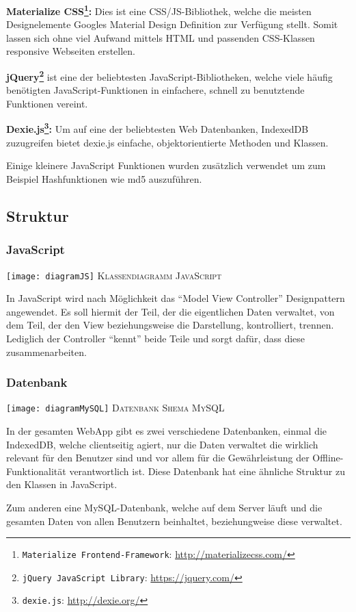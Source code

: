 \documentclass[a4paper,12pt,ngerman,listof=numbered]{scrartcl}      %
\let\oldcite\cite
\renewcommand{\cite}[1]{\textsuperscript{\oldcite{#1}}}
\newcommand{\spacer}{\par\bigskip\noindent}
\providecommand{\inlinecode}[1]{\texttt{#1}}
\begin{document}
	\spacer\textbf{Materialize CSS\footnote{\inlinecode{Materialize Frontend-Framework}: \url{http://materializecss.com/}}:} Dies ist eine CSS/JS-Bibliothek, welche die meisten Designelemente Googles Material Design Definition zur Verfügung stellt. Somit lassen sich ohne viel Aufwand mittels HTML und passenden CSS-Klassen responsive Webseiten erstellen.\par
	\spacer\textbf{jQuery\footnote{\inlinecode{jQuery JavaScript Library}: \url{https://jquery.com/}}} ist eine der beliebtesten JavaScript-Bibliotheken\cite{jQueryCoverage}, welche viele häufig be\-nö\-ti\-gten JavaScript-Funktionen in einfachere, schnell zu benutztende Funktionen vereint.\par
	\spacer\textbf{Dexie.js\footnote{\inlinecode{dexie.js}: \url{http://dexie.org/}}:} Um auf eine der beliebtesten Web Datenbanken, IndexedDB zuzugreifen bietet dexie.js einfache, objektorientierte Methoden und Klassen.\par
	\spacer Einige kleinere JavaScript Funktionen wurden zusätzlich verwendet um zum Beispiel Hashfunktionen wie md5 auszuführen.\par
	
	\newpage
	\subsection{Struktur}
	\subsubsection{JavaScript}
	{
		\centering
		\texttt{[image: diagramJS]}
		\textsc{Klassendiagramm JavaScript}\par
	}
	In JavaScript wird nach Möglichkeit das ``Model View Controller''\cite{wikiMVC} Design\-pat\-tern angewendet. Es soll hiermit der Teil, der die eigentlichen Daten verwaltet, von dem Teil, der den View beziehungsweise die Darstellung, kontrolliert, trennen. Lediglich der Controller ``kennt'' beide Teile und sorgt dafür, dass diese zusammenarbeiten.\par
	
	\subsubsection{Datenbank}
	{
		\centering
		\texttt{[image: diagramMySQL]}
		\textsc{Datenbank Shema MySQL}\par
	}
	In der gesamten WebApp gibt es zwei verschiedene Datenbanken, einmal die IndexedDB, welche clientseitig agiert, nur die Daten verwaltet die wirklich relevant für den Benutzer sind und vor allem für die Gewährleistung der Offline-Funk\-ti\-o\-na\-li\-tät verantwortlich ist. Diese Datenbank hat eine ähnliche Struktur zu den Klassen in JavaScript.\par
	Zum anderen eine MySQL-Datenbank, welche auf dem Server läuft und die gesamten Daten von allen Benutzern beinhaltet, beziehungweise diese verwaltet.\par
	
\end{document}
